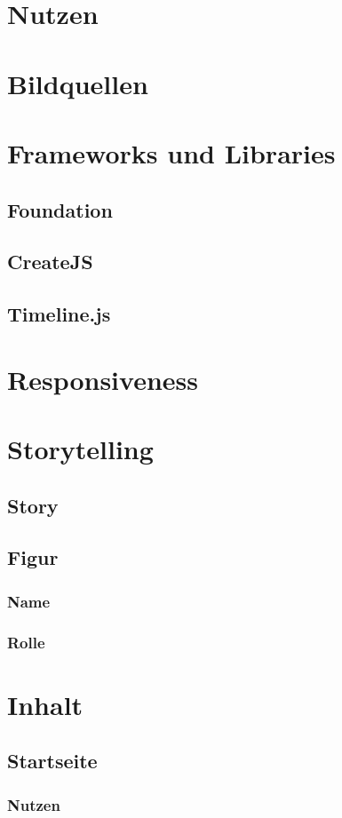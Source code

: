 \section{Nutzen}
\section{Bildquellen}
\section{Frameworks und Libraries}
\subsection{Foundation}
\subsection{CreateJS}
\subsection{Timeline.js}
\section{Responsiveness}
\section{Storytelling}
\subsection{Story}
\subsection{Figur}
\subsubsection{Name}
\subsubsection{Rolle}
\section{Inhalt}
\subsection{Startseite}
\subsubsection{Nutzen}
